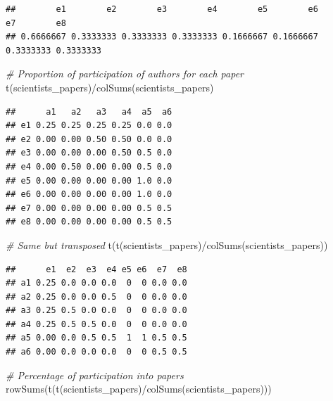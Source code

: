 \documentclass[
  notitlepage,
  onecolumn,
  openany]{book}
\newenvironment{Shaded}{\begin{snugshade}}{\end{snugshade}}
\newcommand{\CommentTok}[1]{\textcolor[rgb]{0.56,0.35,0.01}{\textit{#1}}}
\newcommand{\FunctionTok}[1]{\textcolor[rgb]{0.00,0.00,0.00}{#1}}
\newcommand{\NormalTok}[1]{#1}
\newcommand{\SpecialCharTok}[1]{\textcolor[rgb]{0.00,0.00,0.00}{#1}}
\begin{document}
\begin{verbatim}
##        e1        e2        e3        e4        e5        e6        e7        e8 
## 0.6666667 0.3333333 0.3333333 0.3333333 0.1666667 0.1666667 0.3333333 0.3333333
\end{verbatim}

\begin{Shaded}
\begin{Highlighting}[]
\CommentTok{\# Proportion of participation of authors for each paper}
\FunctionTok{t}\NormalTok{(scientists\_papers)}\SpecialCharTok{/}\FunctionTok{colSums}\NormalTok{(scientists\_papers)}
\end{Highlighting}
\end{Shaded}

\begin{verbatim}
##      a1   a2   a3   a4  a5  a6
## e1 0.25 0.25 0.25 0.25 0.0 0.0
## e2 0.00 0.00 0.50 0.50 0.0 0.0
## e3 0.00 0.00 0.00 0.50 0.5 0.0
## e4 0.00 0.50 0.00 0.00 0.5 0.0
## e5 0.00 0.00 0.00 0.00 1.0 0.0
## e6 0.00 0.00 0.00 0.00 1.0 0.0
## e7 0.00 0.00 0.00 0.00 0.5 0.5
## e8 0.00 0.00 0.00 0.00 0.5 0.5
\end{verbatim}

\begin{Shaded}
\begin{Highlighting}[]
\CommentTok{\# Same but transposed}
\FunctionTok{t}\NormalTok{(}\FunctionTok{t}\NormalTok{(scientists\_papers)}\SpecialCharTok{/}\FunctionTok{colSums}\NormalTok{(scientists\_papers))}
\end{Highlighting}
\end{Shaded}

\begin{verbatim}
##      e1  e2  e3  e4 e5 e6  e7  e8
## a1 0.25 0.0 0.0 0.0  0  0 0.0 0.0
## a2 0.25 0.0 0.0 0.5  0  0 0.0 0.0
## a3 0.25 0.5 0.0 0.0  0  0 0.0 0.0
## a4 0.25 0.5 0.5 0.0  0  0 0.0 0.0
## a5 0.00 0.0 0.5 0.5  1  1 0.5 0.5
## a6 0.00 0.0 0.0 0.0  0  0 0.5 0.5
\end{verbatim}

\begin{Shaded}
\begin{Highlighting}[]
\CommentTok{\# Percentage of participation into papers}
\FunctionTok{rowSums}\NormalTok{(}\FunctionTok{t}\NormalTok{(}\FunctionTok{t}\NormalTok{(scientists\_papers)}\SpecialCharTok{/}\FunctionTok{colSums}\NormalTok{(scientists\_papers)))}
\end{Highlighting}
\end{Shaded}
\end{document}

